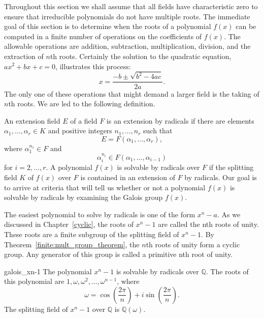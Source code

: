  
Throughout this section we shall assume that all fields have
characteristic zero to ensure that irreducible polynomials do not have
multiple roots. The immediate goal of this section is to determine when
the roots of a polynomial $f(x)$ can be computed in a finite number of
operations on the coefficients of $f(x)$. The allowable operations are
addition, subtraction, multiplication, division, and the extraction
of $n$th roots. Certainly the solution to the quadratic equation,
$a x^2 + b x +c=0$, illustrates this process:
\[
x = \frac{-b \pm \sqrt{b^2 - 4ac}}{2a}.
\]
The only one of these operations that might demand a larger field is
the taking of $n$th roots.  We are led to the following definition.
 
 
An extension field $E$ of a field $F$ is an 
{\bfi extension by radicals\/} if there are
elements $\alpha_1, \ldots, \alpha_r \in K$ and positive integers
$n_1, \ldots, n_r$ such that  
\[
E=F(\alpha_1, \ldots, \alpha_r ),
\]
where $\alpha_1^{n_1} \in F$ and
\[
\alpha_i^{n_i} \in F( \alpha_1, \ldots, \alpha_{i-1} )
\]
for $i = 2, \dots, r$. A polynomial $f(x)$ is {\bfi solvable by
radicals\/} over $F$ if the splitting
field $K$ of $f(x)$ over $F$ is contained in an extension of $F$ by
radicals. Our goal is to arrive at  
criteria that will tell us whether or not a polynomial $f(x)$ is
solvable by radicals by examining the Galois group $f(x)$.
 
 
The easiest polynomial to solve by radicals is one of the form $x^n -
a$. As we discussed in Chapter~\ref{cyclic}, the roots of $x^n - 1$ are called
the {\bfi nth roots of unity}.  These
roots are a finite subgroup of the splitting field of $x^n -1$. By
Theorem~\ref{finite:mult_group_theorem}, the $n$th roots of unity form a cyclic group.  Any
generator of this group is called a {\bfi primitive nth root of
unity}. 


 
 

\begin{example}{galois_xn-1}
The polynomial $x^n - 1$ is solvable by radicals over ${\mathbb Q}$. The
roots of this polynomial are $1, \omega, \omega^2, \ldots,
\omega^{n-1}$, where
\[
\omega = \cos\left( \frac{2 \pi}{n} \right) + 
i \sin\left( \frac{2 \pi}{n} \right).
\] 
The splitting field of $x^n - 1$ over ${\mathbb Q}$ is ${\mathbb Q}(\omega)$.
\end{example}
 
